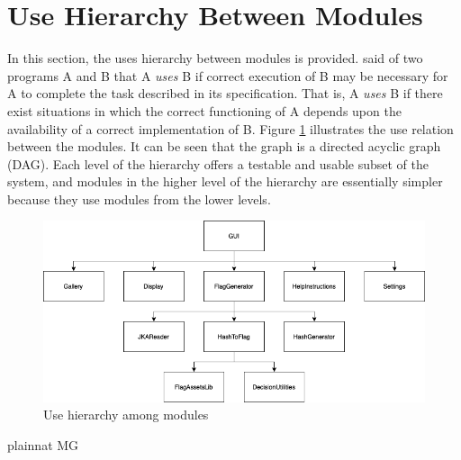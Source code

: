 \documentclass[12pt, titlepage]{article}
\begin{document}
\section{Use Hierarchy Between Modules} \label{SecUse}

In this section, the uses hierarchy between modules is provided.
\citet{Parnas1978} said of two programs A and B that A {\em uses} B if correct
execution of B may be necessary for A to complete the task described in its
specification. That is, A {\em uses} B if there exist situations in which the
correct functioning of A depends upon the availability of a correct
implementation of B.  Figure \ref{FigUH} illustrates the use relation between
the modules. It can be seen that the graph is a directed acyclic graph (DAG).
Each level of the hierarchy offers a testable and usable subset of the system,
and modules in the higher level of the hierarchy are essentially simpler
because they use modules from the lower levels.

\begin{figure}[H]
\centering
\includegraphics[width=1.0\textwidth]{UsesHierarchy.png}
\caption{Use hierarchy among modules}
\label{FigUH}
\end{figure}


 {plainnat}
 {MG}
\end{document}
